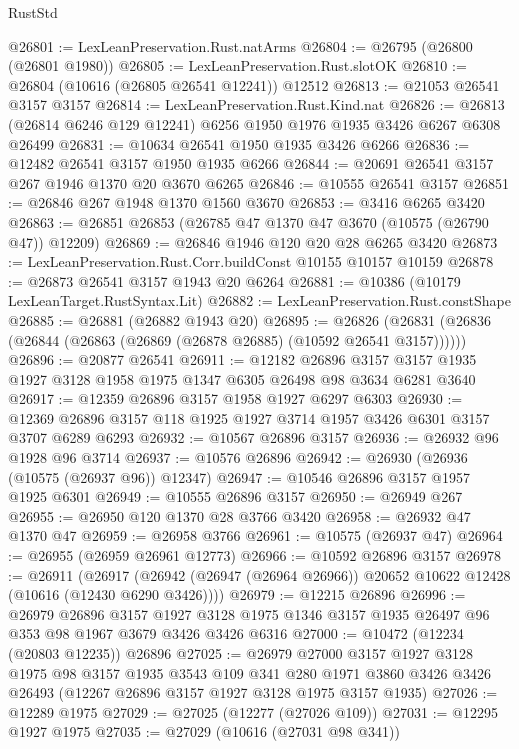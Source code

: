 \begin{lexlean}{RustStd}
\begin{coremodule}
@26801 := LexLeanPreservation.Rust.natArms
@26804 := @26795 (@26800 (@26801 @1980))
@26805 := LexLeanPreservation.Rust.slotOK
@26810 := @26804 (@10616 (@26805 @26541 @12241)) @12512
@26813 := @21053 @26541 @3157 @3157
@26814 := LexLeanPreservation.Rust.Kind.nat
@26826 := @26813 (@26814 @6246 @129 @12241) @6256 @1950 @1976 @1935 @3426 @6267 @6308 @26499
@26831 := @10634 @26541 @1950 @1935 @3426 @6266
@26836 := @12482 @26541 @3157 @1950 @1935 @6266
@26844 := @20691 @26541 @3157 @267 @1946 @1370 @20 @3670 @6265
@26846 := @10555 @26541 @3157
@26851 := @26846 @267 @1948 @1370 @1560 @3670
@26853 := @3416 @6265 @3420
@26863 := @26851 @26853 (@26785 @47 @1370 @47 @3670 (@10575 (@26790 @47)) @12209)
@26869 := @26846 @1946 @120 @20 @28 @6265 @3420
@26873 := LexLeanPreservation.Rust.Corr.buildConst @10155 @10157 @10159
@26878 := @26873 @26541 @3157 @1943 @20 @6264
@26881 := @10386 (@10179 LexLeanTarget.RustSyntax.Lit)
@26882 := LexLeanPreservation.Rust.constShape
@26885 := @26881 (@26882 @1943 @20)
@26895 := @26826 (@26831 (@26836 (@26844 (@26863 (@26869 (@26878 @26885) (@10592 @26541 @3157))))))
@26896 := @20877 @26541
@26911 := @12182
    @26896
    @3157
    @3157
    @1935
    @1927
    @3128
    @1958
    @1975
    @1347
    @6305
    @26498
    @98
    @3634
    @6281
    @3640
@26917 := @12359 @26896 @3157 @1958 @1927 @6297 @6303
@26930 := @12369 @26896 @3157 @118 @1925 @1927 @3714 @1957 @3426 @6301 @3157 @3707 @6289 @6293
@26932 := @10567 @26896 @3157
@26936 := @26932 @96 @1928 @96 @3714
@26937 := @10576 @26896
@26942 := @26930 (@26936 (@10575 (@26937 @96)) @12347)
@26947 := @10546 @26896 @3157 @1957 @1925 @6301
@26949 := @10555 @26896 @3157
@26950 := @26949 @267
@26955 := @26950 @120 @1370 @28 @3766 @3420
@26958 := @26932 @47 @1370 @47
@26959 := @26958 @3766
@26961 := @10575 (@26937 @47)
@26964 := @26955 (@26959 @26961 @12773)
@26966 := @10592 @26896 @3157
@26978 := @26911
    (@26917 (@26942 (@26947 (@26964 @26966)) @20652 @10622 @12428 (@10616 (@12430 @6290 @3426))))
@26979 := @12215 @26896
@26996 := @26979
    @26896
    @3157
    @1927
    @3128
    @1975
    @1346
    @3157
    @1935
    @26497
    @96
    @353
    @98
    @1967
    @3679
    @3426
    @3426
    @6316
@27000 := @10472 (@12234 (@20803 @12235)) @26896
@27025 := @26979
    @27000
    @3157
    @1927
    @3128
    @1975
    @98
    @3157
    @1935
    @3543
    @109
    @341
    @280
    @1971
    @3860
    @3426
    @3426
    @26493
    (@12267 @26896 @3157 @1927 @3128 @1975 @3157 @1935)
@27026 := @12289 @1975
@27029 := @27025 (@12277 (@27026 @109))
@27031 := @12295 @1927 @1975
@27035 := @27029 (@10616 (@27031 @98 @341))

\end{coremodule}
\end{lexlean}
